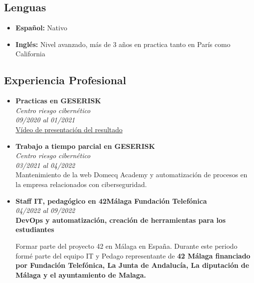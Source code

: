 \documentclass[11pt, oneside, a4paper, titlepage]{article}
\begin{document}
\begin{tcolorbox}
\begin{minipage}[t]{8cm}
\begin{tcolorbox}[grow to
			left by=0.6cm,colback=gray!25,colframe=white]
		\section*{Lenguas} 
			\begin{itemize}
				\item{\textbf{Español:} Nativo}
				\item{\textbf{Inglés:} Nivel avanzado, más de 3 años en practica tanto en París como California}
			\end{itemize}
		\end{tcolorbox} \end{minipage} 
		\begin{minipage}[t]{11cm}
		\vspace*{-0.5cm} 
			\begin{tcolorbox}[grow to right
		by=0.75cm,colframe=white,colback=white] 
				\section{Experiencia Profesional} 

			\begin{itemize} 
				\item { \textbf{Practicas en GESERISK} \\
				\emph{Centro riesgo cibernético} \\ \emph{09/2020 al
				01/2021} \\ 
				\href{https://youtu.be/AlB1oqxZPXA}{Vídeo de
				presentación del resultado}} 
				\item { 
					\textbf{Trabajo a tiempo parcial en GESERISK} \\
					\emph{Centro riesgo cibernético} \\ 
					\emph{03/2021 al 04/2022} \\ 

					Mantenimiento de la web Domecq Academy y
					automatización de procesos en la empresa relacionados con
					ciberseguridad. 
				} 
				\item { 
					\textbf{Staff IT, pedagógico en 42Málaga Fundación Telefónica} \\ 
					\emph{04/2022 al 09/2022} \\ 
					\textbf{DevOps y automatización, creación de
					herramientas para los estudiantes}

					Formar parte del proyecto 42 en Málaga en España. Durante
					este periodo formé parte del equipo IT y Pedago
					representante de \textbf{42 Málaga financiado por Fundación
					Telefónica, La Junta de Andalucía, La diputación de Málaga y el
					ayuntamiento de Malaga.}
					
}
\end{itemize}
\end{tcolorbox}
\end{minipage}
\end{tcolorbox}
\end{document}
